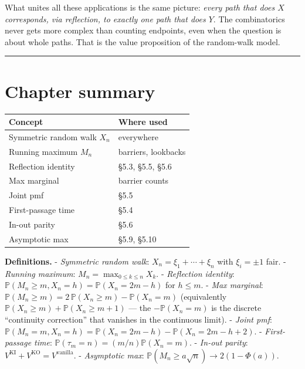 \documentclass[
  10pt,
  twoside]{book}
\newcounter{none} %
\begin{document}
What unites all these applications is the same picture: \emph{every path
that does \(X\) corresponds, via reflection, to exactly one path that
does \(Y\)}. The combinatorics never gets more complex than counting
endpoints, even when the question is about whole paths. That is the
value proposition of the random-walk model.

\begin{center}\rule{0.5\linewidth}{0.5pt}\end{center}

\section{Chapter summary}\label{chapter-summary-2}

{\def\LTcaptype{none} %
\begin{table}[H]
\centering
\begin{tabular}{|l|l|}
\toprule
Concept & Where used \\
\midrule



Symmetric random walk \(X_n\) & everywhere \\
Running maximum \(M_n\) & barriers, lookbacks \\
Reflection identity & §5.3, §5.5, §5.6 \\
Max marginal & barrier counts \\
Joint pmf & §5.5 \\
First-passage time & §5.4 \\
In-out parity & §5.6 \\
Asymptotic max & §5.9, §5.10 \\
\bottomrule
\end{tabular}
\end{table}
}

\textbf{Definitions.} - \emph{Symmetric random walk}:
\(X_n = \xi_1 + \cdots + \xi_n\) with \(\xi_i = \pm 1\) fair. -
\emph{Running maximum}: \(M_n = \max_{0 \le k \le n} X_k\). -
\emph{Reflection identity}:
\(\mathbb P(M_n \ge m, X_n = h) = \mathbb P(X_n = 2m - h)\) for
\(h \le m\). - \emph{Max marginal}:
\(\mathbb P(M_n \ge m) = 2\,\mathbb P(X_n \ge m) - \mathbb P(X_n = m)\)
(equivalently \(\mathbb P(X_n \ge m) + \mathbb P(X_n \ge m+1)\) --- the
\(-\mathbb P(X_n = m)\) is the discrete ``continuity correction'' that
vanishes in the continuous limit). - \emph{Joint pmf}:
\(\mathbb P(M_n = m, X_n = h) = \mathbb P(X_n = 2m-h) - \mathbb P(X_n = 2m-h+2)\).
- \emph{First-passage time}:
\(\mathbb P(\tau_m = n) = (m/n)\mathbb P(X_n = m)\). - \emph{In-out
parity}: \(V^{\text{KI}} + V^{\text{KO}} = V^{\text{vanilla}}\). -
\emph{Asymptotic max}:
\(\mathbb P(M_n \ge a\sqrt n) \to 2(1 - \Phi(a))\).
\end{document}
